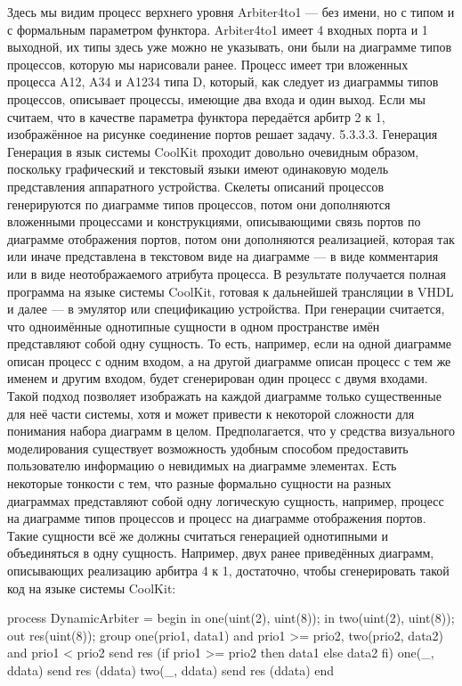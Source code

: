 Здесь мы видим процесс верхнего уровня Arbiter4to1 --- без имени, но с типом и с формальным параметром функтора. Arbiter4to1 имеет 4 входных порта и 1 выходной, их типы здесь уже можно не указывать, они были на диаграмме типов процессов, которую мы нарисовали ранее. Процесс имеет три вложенных процесса A12, A34 и A1234 типа D, который, как следует из диаграммы типов процессов, описывает процессы, имеющие два входа и один выход. Если мы считаем, что в качестве параметра функтора передаётся арбитр 2 к 1, изображённое на рисунке соединение портов решает задачу.
5.3.3.3. Генерация
Генерация в язык системы CoolKit проходит довольно очевидным образом, поскольку графический и текстовый языки имеют одинаковую модель представления аппаратного устройства. Скелеты описаний процессов генерируются по диаграмме типов процессов, потом они дополняются вложенными процессами и конструкциями, описывающими связь портов по диаграмме отображения портов, потом они дополняются реализацией, которая так или иначе представлена в текстовом виде на диаграмме --- в виде комментария или в виде неотображаемого атрибута процесса. В результате получается полная программа на языке системы CoolKit, готовая к дальнейшей трансляции в VHDL и далее --- в эмулятор или спецификацию устройства.
При генерации считается, что одноимённые однотипные сущности в одном пространстве имён представляют собой одну сущность. То есть, например, если на одной диаграмме описан процесс с одним входом, а на другой диаграмме описан процесс с тем же именем и другим входом, будет сгенерирован один процесс с двумя входами. Такой подход позволяет изображать на каждой диаграмме только существенные для неё части системы, хотя и может привести к некоторой сложности для понимания набора диаграмм в целом. Предполагается, что у средства визуального моделирования существует возможность удобным способом предоставить пользователю информацию о невидимых на диаграмме элементах. Есть некоторые тонкости с тем, что разные формально сущности на разных диаграммах представляют собой одну логическую сущность, например, процесс на диаграмме типов процессов и процесс на диаграмме отображения портов. Такие сущности всё же должны считаться генерацией однотипными и объединяться в одну сущность. Например, двух ранее приведённых диаграмм, описывающих реализацию арбитра 4 к 1, достаточно, чтобы сгенерировать такой код на языке системы CoolKit:

process DynamicArbiter =
begin
  in one(uint(2), uint(8));
  in two(uint(2), uint(8));
  out res(uint(8));
  group {
    one(prio1, data1) and prio1 >= prio2,
    two(prio2, data2) and prio1 < prio2
    {
      send res (if prio1 >= prio2 then data1 else data2 fi)
    }
    one(_, ddata) {send res (ddata)}
    two(_, ddata) {send res (ddata)}
  }
end

